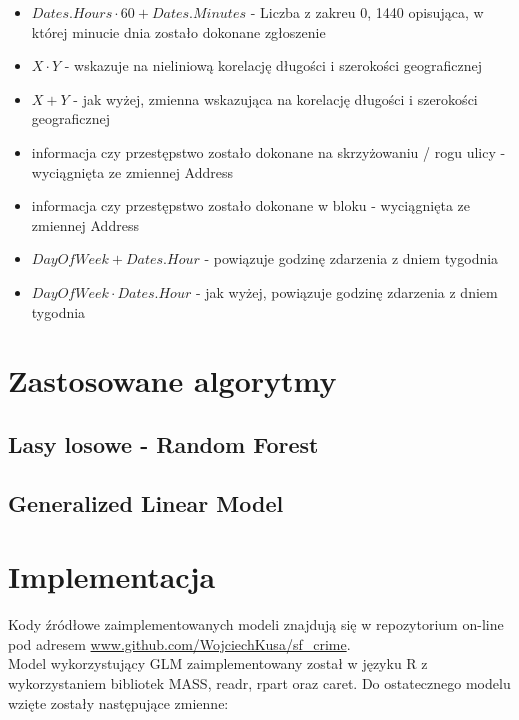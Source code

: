 \documentclass[11pt]{article} %
\begin{document}
\begin{itemize}
\item $Dates.Hours \cdot 60 + Dates.Minutes$ - Liczba z zakreu {0, 1440} opisująca, w której minucie dnia zostało dokonane zgłoszenie

\item $X \cdot Y$ - wskazuje na nieliniową korelację długości i szerokości geograficznej

\item $X + Y$ - jak wyżej, zmienna wskazująca na korelację długości i szerokości geograficznej

\item informacja czy przestępstwo zostało dokonane na skrzyżowaniu / rogu ulicy - wyciągnięta ze zmiennej Address

\item informacja czy przestępstwo zostało dokonane w bloku - wyciągnięta ze zmiennej Address

\item $DayOfWeek + Dates.Hour$  - powiązuje godzinę zdarzenia z dniem tygodnia

\item $DayOfWeek \cdot Dates.Hour$ -  jak wyżej, powiązuje godzinę zdarzenia z dniem tygodnia

\end{itemize}


\section{Zastosowane algorytmy}
\subsection{Lasy losowe - Random Forest}

\subsection{Generalized Linear Model}


\section{Implementacja}

Kody źródłowe zaimplementowanych modeli znajdują się w repozytorium on-line pod adresem \url{www.github.com/WojciechKusa/sf_crime}. \\

Model wykorzystujący GLM zaimplementowany został w języku R z wykorzystaniem bibliotek MASS, readr, rpart oraz caret. Do ostatecznego modelu wzięte zostały następujące zmienne:
\end{document}
